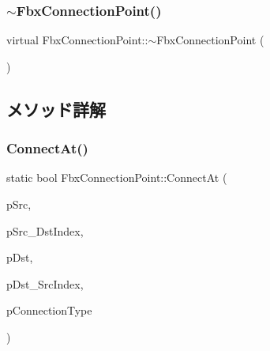 \mbox{\label{class_fbx_connection_point_a806c8989f3700242c2aa7b9ec74e7396}} 
\subsubsection{\texorpdfstring{$\sim$\+Fbx\+Connection\+Point()}{~FbxConnectionPoint()}}
{\footnotesize\ttfamily virtual Fbx\+Connection\+Point\+::$\sim$\+Fbx\+Connection\+Point (\begin{DoxyParamCaption}{ }\end{DoxyParamCaption})\hspace{0.3cm}{\ttfamily [virtual]}}



\subsection{メソッド詳解}
\mbox{\label{class_fbx_connection_point_ac02d782e45f10a7b0961d24097e5dcbd}} 
\subsubsection{\texorpdfstring{Connect\+At()}{ConnectAt()}}
{\footnotesize\ttfamily static bool Fbx\+Connection\+Point\+::\+Connect\+At (\begin{DoxyParamCaption}\item[{\hyperlink{class_fbx_connection_point}{Fbx\+Connection\+Point} $\ast$}]{p\+Src,  }\item[{int}]{p\+Src\+\_\+\+Dst\+Index,  }\item[{\hyperlink{class_fbx_connection_point}{Fbx\+Connection\+Point} $\ast$}]{p\+Dst,  }\item[{int}]{p\+Dst\+\_\+\+Src\+Index,  }\item[{\hyperlink{class_fbx_connection_a3df448a5db356652ab99fd2be2553749}{Fbx\+Connection\+::\+E\+Type}}]{p\+Connection\+Type }\end{DoxyParamCaption})\hspace{0.3cm}{\ttfamily [static]}}

